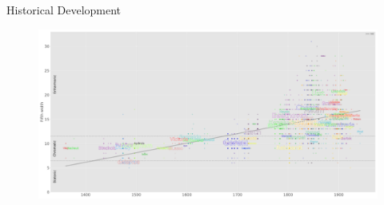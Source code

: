 \documentclass[final]{beamer}
\begin{document}
\begin{frame}[t]
\begin{minipage}[t][.3\textheight][t]{\textwidth}
\begin{block}{Historical Development}
    \begin{figure}
      \centering
      \includegraphics{img/fifth_widths}
    \end{figure}

  \end{block}
\end{minipage}

\end{frame} %
\end{document}
